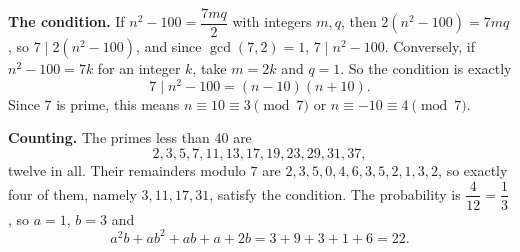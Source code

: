 \textbf{The condition.} If $n^2-100=\dfrac{7mq}{2}$ with integers $m,q$, then $2\left(n^2-100\right)=7mq$, so $7\mid2\left(n^2-100\right)$, and since $\gcd(7,2)=1$, $7\mid n^2-100$. Conversely, if $n^2-100=7k$ for an integer $k$, take $m=2k$ and $q=1$. So the condition is exactly
\[7\mid n^2-100=(n-10)(n+10).\]
Since $7$ is prime, this means $n\equiv10\equiv3\pmod 7$ or $n\equiv-10\equiv4\pmod7$.

\textbf{Counting.} The primes less than $40$ are
\[2,3,5,7,11,13,17,19,23,29,31,37,\]
twelve in all. Their remainders modulo $7$ are $2,3,5,0,4,6,3,5,2,1,3,2$, so exactly four of them, namely $3,11,17,31$, satisfy the condition. The probability is $\dfrac{4}{12}=\dfrac{1}{3}$, so $a=1$, $b=3$ and
\[a^2b+ab^2+ab+a+2b=3+9+3+1+6=\boxed{22}.\]
